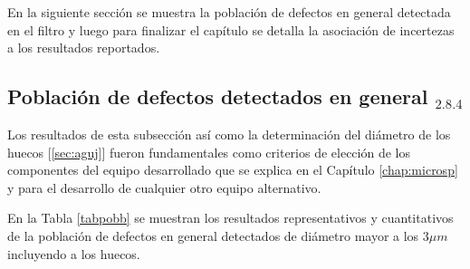 En la siguiente sección se muestra la población de defectos en general detectada en el filtro y luego para finalizar el capítulo se detalla la asociación de incertezas a los resultados reportados.


\singlespacing
\subsection{Población de defectos detectados en general \href{https://github.com/jrr1984/defects\_analysis/blob/master/general\_defects\_population.ipynb}{\faGithub$_{2.8.4}$}}
\label{sec:defpob}

\hspace{0.5cm}Los resultados de esta subsección así como la determinación del diámetro de los huecos [\ref{sec:aguj}] fueron fundamentales como criterios de elección de los componentes del equipo desarrollado que se explica en el Capítulo \ref{chap:microsp} y para el desarrollo de cualquier otro equipo alternativo.

En la Tabla \ref{tabpobb} se muestran los resultados representativos y cuantitativos de la población de defectos en general detectados de diámetro mayor a los $3\mu m$ incluyendo a los huecos.

